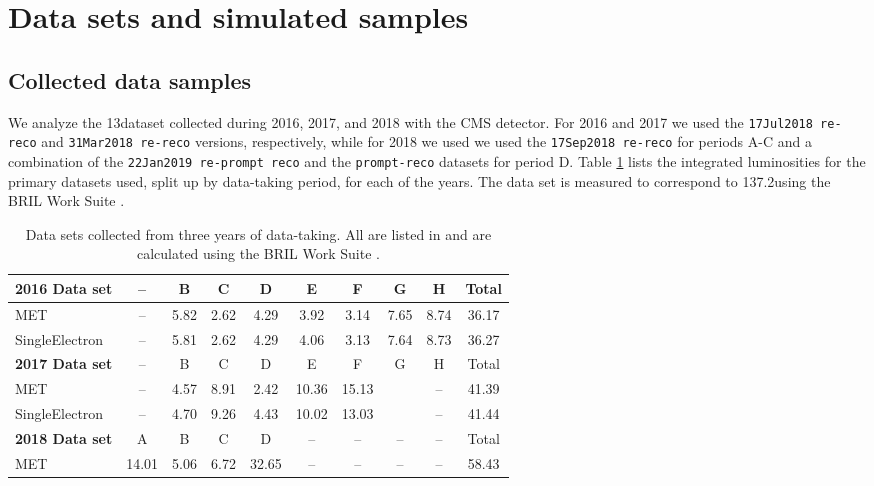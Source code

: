 \section{Data sets and simulated samples\label{sec:datasets}}

\subsection{Collected data samples}
\label{sec:data-samples}

We analyze the 13\TeV dataset collected during 2016, 2017, and 2018 with the CMS detector.
For 2016 and 2017 we used the \texttt{17Jul2018 re-reco} and \texttt{31Mar2018 re-reco} versions, respectively,
while for 2018 we used we used the \texttt{17Sep2018 re-reco} for periods A-C and a combination of the \texttt{22Jan2019 re-prompt reco} and the \texttt{prompt-reco} datasets for period D.
Table \ref{tab:DataSamples} lists the integrated luminosities for the primary datasets used,
split up by data-taking period, for each of the years.
The data set is measured to correspond to 137.2\fbinv using the BRIL Work Suite \cite{bril}.

\begin{table}[hp]
\centering
\caption{Data sets collected from three years of data-taking. All \lint are listed in \fbinv and are calculated using the BRIL Work Suite \cite{bril}.}
\label{tab:DataSamples}
{\footnotesize
\begin{tabular}{|lccccccccc|}
\hline
\textbf{2016 Data set} & \textbf{--} & B    & C    & D     & E    & F     & G    & H    & Total \\ \hline
MET                   & --          & 5.82 & 2.62 & 4.29  & 3.92 & 3.14 & 7.65 & 8.74 & 36.17 \\
SingleElectron        & --          & 5.81 & 2.62 & 4.29  & 4.06 & 3.13 & 7.64 & 8.73 & 36.27 \\
\textbf{2017 Data set} & --          & B    & C    & D     & E    & F     & G    & H    & Total \\ \hline
MET                   & --          & 4.57 & 8.91 & 2.42  & 10.36 & 15.13 &      & --   & 41.39 \\
SingleElectron        & --          & 4.70 & 9.26 & 4.43  & 10.02 & 13.03 &      & --   & 41.44 \\
\textbf{2018 Data set} & A           & B    & C    & D     & --   & --    & --   & --   & Total \\ \hline
MET                   & 14.01          & 5.06      & 6.72 & 32.65 & --   & --    & --   & --   & 58.43 \\ \hline
\end{tabular}
}
\end{table}

